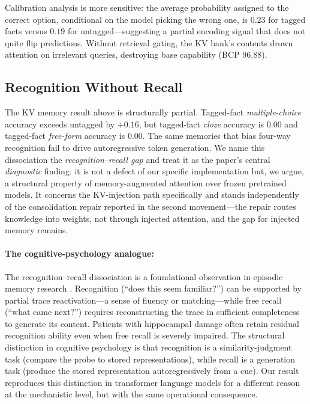 Calibration analysis is more sensitive: the average probability assigned to the correct option, conditional on the model picking the wrong one, is $0.23$ for tagged facts versus $0.19$ for untagged---suggesting a partial encoding signal that does not quite flip predictions. Without retrieval gating, the KV bank's contents drown attention on irrelevant queries, destroying base capability (BCP $96.88$).

\subsection{Recognition Without Recall}
\label{sec:results_rwr}

The KV memory result above is structurally partial. Tagged-fact \emph{multiple-choice} accuracy exceeds untagged by $+0.16$, but tagged-fact \emph{cloze} accuracy is $0.00$ and tagged-fact \emph{free-form} accuracy is $0.00$. The same memories that bias four-way recognition fail to drive autoregressive token generation. We name this dissociation the \emph{recognition--recall gap} and treat it as the paper's central \emph{diagnostic} finding: it is not a defect of our specific implementation but, we argue, a structural property of memory-augmented attention over frozen pretrained models. It concerns the KV-injection path specifically and stands independently of the consolidation repair reported in the second movement---the repair routes knowledge into weights, not through injected attention, and the gap for injected memory remains.

\paragraph{The cognitive-psychology analogue:} The recognition--recall dissociation is a foundational observation in episodic memory research \citep{morris2006elements}. Recognition (``does this seem familiar?'') can be supported by partial trace reactivation---a sense of fluency or matching---while free recall (``what came next?'') requires reconstructing the trace in sufficient completeness to generate its content. Patients with hippocampal damage often retain residual recognition ability even when free recall is severely impaired. The structural distinction in cognitive psychology is that recognition is a similarity-judgment task (compare the probe to stored representations), while recall is a generation task (produce the stored representation autoregressively from a cue). Our result reproduces this distinction in transformer language models for a different reason at the mechanistic level, but with the same operational consequence.

